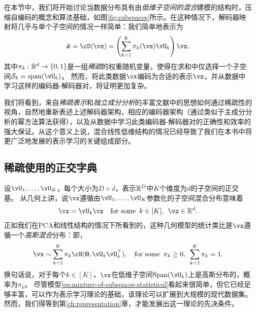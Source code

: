 \documentclass[../../book-main_zh.tex]{subfiles}
\begin{document}
在本节中，我们将开始讨论当数据分布具有由\textit{低维子空间的混合}建模的结构时，压缩自编码的概念和算法基础，如图\ref{fig:subspaces}所示。在这种情况下，解码器映射将几乎与单个子空间的情况一样简单：我们简单地表示为
\begin{equation}\label{eq:mixture-subspaces-decoder-first-cut}
    \hat{\x} = \cD(\vz) = \left( \sum_{k=1}^K \pi_k(\vz)\vU_k \right) \vz,
\end{equation}
其中$\pi_k : \R^d \to \set{0,1}$是一组\textit{稀疏}的权重随机变量，使得在求和中仅选择一个子空间$\mathcal{S}_k = \mbox{span}(\vU_k)$。
然而，将此类数据$\vx$编码为合适的表示$\vz$，并从数据中学习这样的编码器-解码器对，将证明更加复杂。

我们将看到，来自\textit{稀疏表示}和\textit{独立成分分析}的丰富文献中的思想如何通过稀疏性的视角，自然地重新表述上述解码器架构，相应的编码器架构（通过类似于主成分分析的幂方法算法获得），以及从数据中学习此类编码器-解码器对的正确性和效率的强大保证。从这个意义上说，混合线性低维结构的情况已经导致了我们在本书中将更广泛地发展的表示学习的关键组成部分。

\subsection{稀疏使用的正交字典}


设$\vU_1, \dots, \vU_K$，每个大小为$D \times d$，表示$\mathbb{R}^D$中$K$个维度为$d$的子空间的正交基。
从几何上讲，说$\vx$遵循由$\vU_1, \dots, \vU_K$参数化的子空间混合分布意味着
\begin{equation}\label{eq:mixture-of-subspaces-geometric}
    \vx = \vU_k \vz  \quad \text{for some} \enspace k \in [K],\enspace \vz \in \R^d.
\end{equation}
正如我们在PCA和线性结构的情况下所看到的，这种几何模型的统计类比是$\vx$遵循一个\textit{高斯混合}分布：即，
\begin{equation}\label{eq:mixture-of-subspaces-statistical}
    \vx \sim \sum_{k=1}^K \pi_k \cN(\mathbf{0}, \vU_k\vU_k^\top), \quad \text{for some} \enspace \pi_k \geq 0,\enspace \sum_{k=1}^K \pi_k = 1.
\end{equation}
换句话说，对于每个$k \in [K]$，$\vx$在低维子空间$\Span(\vU_k)$上是高斯分布的，概率为$\pi_k$。
尽管模型\eqref{eq:mixture-of-subspaces-statistical}看起来很简单，但它已经足够丰富，可以作为表示学习理论的基础，该理论可以扩展到大规模的现代数据集。
然而，我们得等到第\ref{ch:representation}章，才能发展出这一理论的先决条件。
\end{document}
